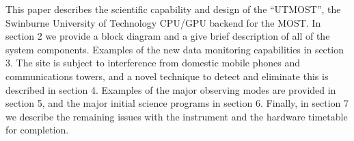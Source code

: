 This paper describes the scientific capability and design of the ``UTMOST'', the Swinburne University of Technology CPU/GPU backend for the MOST. In section 2 we provide a block diagram and a give brief description of all of the system components. Examples of the new data monitoring capabilities in section 3. The site is subject to interference from domestic mobile phones and communications towers, and a novel technique to detect and eliminate this is described in section 4. Examples of the major observing modes are provided in section 5, and the major initial science programs in section 6. Finally, in section 7 we describe the remaining issues with the instrument and the hardware timetable for completion.



